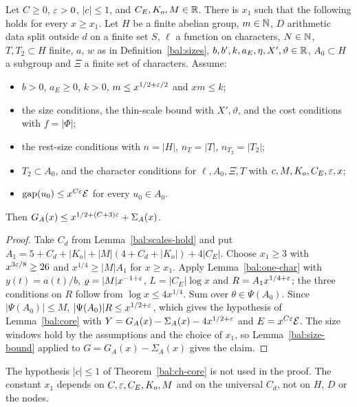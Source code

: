 \begin{theorem}\label{bal:ch-core}
Let $C\ge0$, $\varepsilon>0$, $|c|\le1$, and $C_E,K_o,M\in\mathbb{R}$. There is $x_1$ such that the following holds for every $x\ge x_1$. Let $H$ be a finite abelian group, $m\in\mathbb{N}$, $D$ arithmetic data split outside $d$ on a finite set $S$, $\ell$ a function on characters, $N\in\mathbb{N}$, $T,T_2\subset H$ finite, $a$, $w$ as in Definition~\ref{bal:sizes}, $b,b',k,a_E,\eta,X',\vartheta\in\mathbb{R}$, $A_0\subset H$ a subgroup and $\Xi$ a finite set of characters. Assume:
\begin{itemize}
\item $b>0$, $a_E\ge0$, $k>0$, $m\le x^{1/2+\varepsilon/2}$ and $xm\le k$;
\item the size conditions, the thin-scale bound with $X',\vartheta$, and the cost conditions with $f=|\Phi|$;
\item the rest-size conditions with $n=|H|$, $n_T=|T|$, $n_{T_2}=|T_2|$;
\item $T_2\subset A_0$, and the character conditions for $\ell,A_0,\Xi,T$ with $c,M,K_o,C_E,\varepsilon,x$;
\item $\mathrm{gap}(u_0)\le x^{C\varepsilon}\mathcal E$ for every $u_0\in A_0$.
\end{itemize}
Then $G_A(x)\le x^{1/2+(C+3)\varepsilon}+\Sigma_A(x)$.
\end{theorem}
\begin{proof}
Take $C_d$ from Lemma~\ref{bal:scales-hold} and put $A_1=5+C_d+|K_o|+|M|(4+C_d+|K_o|)+4|C_E|$. Choose $x_1\ge3$ with $x^{3\varepsilon/8}\ge26$ and $x^{1/4}\ge|M|A_1$ for $x\ge x_1$. Apply Lemma~\ref{bal:one-char} with $y(t)=a(t)/b$, $\varrho=|M|x^{-1+\varepsilon}$, $L=|C_E|\log x$ and $R=A_1x^{1/4+\varepsilon}$; the three conditions on $R$ follow from $\log x\le4x^{1/4}$. Sum over $\theta\in\Psi(A_0)$. Since $|\Psi(A_0)|\le M$, $|\Psi(A_0)|R\le x^{1/2+\varepsilon}$, which gives the hypothesis of Lemma~\ref{bal:core} with $Y=G_A(x)-\Sigma_A(x)-4x^{1/2+\varepsilon}$ and $E=x^{C\varepsilon}\mathcal E$. The size windows hold by the assumptions and the choice of $x_1$, so Lemma~\ref{bal:size-bound} applied to $G=G_A(x)-\Sigma_A(x)$ gives the claim.
\end{proof}

\begin{remark}
The hypothesis $|c|\le1$ of Theorem~\ref{bal:ch-core} is not used in the proof. The constant $x_1$ depends on $C,\varepsilon,C_E,K_o,M$ and on the universal $C_d$, not on $H$, $D$ or the nodes.
\end{remark}


